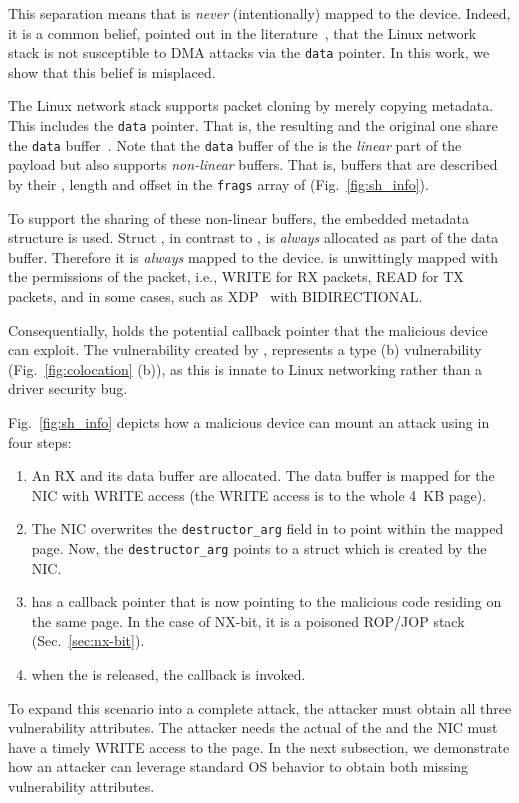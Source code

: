 This separation means that \skb{} is \emph{never} (intentionally) mapped to the device. Indeed, it is a common belief, pointed out in the literature~\cite{thunder}, that the Linux network stack is not susceptible to DMA attacks via the \texttt{data} pointer. In this work, we show that this belief is misplaced.

The Linux network stack supports packet cloning by merely copying \skb{} metadata. This includes the \texttt{data} pointer. That is, the resulting \skb{} and the original one share the \texttt{data} buffer~\cite{drivers2005linux}. Note that the \texttt{data} buffer of the \skb{} is the \emph{linear} part of the payload but \skb{} also supports \emph{non-linear} buffers. That is, buffers that are described by their \page{}, length and offset in the \texttt{frags} array of \shinfo{} (Fig.~\ref{fig:sh_info}). 

To support the sharing of these non-linear buffers, the embedded \shinfo{} metadata structure is used.
Struct \shinfo{}, in contrast to \skb{}, is \emph{always} allocated as part of the data buffer. Therefore it is \emph{always} mapped to the device. \shinfo{} is unwittingly mapped with the permissions of the packet, i.e., WRITE for RX packets, READ for TX packets, and in some cases, such as XDP~\cite{xdp} with BIDIRECTIONAL.

Consequentially, \shinfo{} holds the potential callback pointer that the malicious device can exploit. The \subpage{} vulnerability created by \shinfo{}, represents a type (b) vulnerability (Fig.~\ref{fig:colocation} (b)), as this is innate to Linux networking rather than a driver security bug. 

Fig.~\ref{fig:sh_info} depicts how a malicious device can mount an attack using \shinfo{} in four steps:
\begin{enumerate}[label=(\alph*)]
    \item An RX \skb{} and its data buffer are allocated. The data buffer is mapped for the NIC with WRITE access (the WRITE access is to the whole 4~KB page). 
    \item The NIC overwrites the \texttt{destructor\_arg} field in \shinfo{} to point within the mapped page. Now, the \texttt{destructor\_arg} points to a struct \uarg{} which is created by the NIC.
    \item \uarg{} has a callback pointer that is now pointing to the malicious code residing on the same page. In the case of NX-bit, it is a poisoned ROP/JOP\cite{BJFL11} stack (Sec.~\ref{sec:nx-bit}).
    \item when the \skb{} is released, the callback is invoked.
\end{enumerate}
To expand this scenario into a complete attack, the attacker must obtain all three vulnerability attributes. The attacker needs the actual \kva{} of the \mabaf{} and the NIC must have a timely WRITE access to the page. In the next subsection, we demonstrate how an attacker can leverage standard OS behavior to obtain both missing vulnerability attributes.

